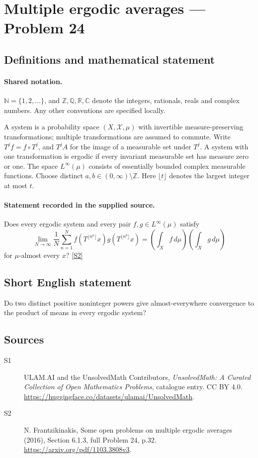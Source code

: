 \documentclass[11pt]{article}
\newcommand{\sref}[2]{\hyperlink{source:#1:#2}{[S#2]}}
\begin{document}
\section{Multiple ergodic averages — Problem 24}\label{statement}

\subsection{Definitions and mathematical statement}

\paragraph{Shared notation.}$\mathbb N=\{1,2,\ldots\}$, and $\mathbb Z,\mathbb Q,\mathbb R,\mathbb C$ denote the integers, rationals, reals and complex numbers. Any other conventions are specified locally.


A system is a probability space $(X,\mathcal X,\mu)$ with invertible measure-preserving transformations; multiple transformations are assumed to commute. Write $T^j f=f\circ T^j$, and $T^j A$ for the image of a measurable set under $T^j$. A system with one transformation is ergodic if every invariant measurable set has measure zero or one. The space $L^\infty(\mu)$ consists of essentially bounded complex measurable functions. Choose distinct $a,b\in(0,\infty)\setminus\mathbb Z$. Here $\lfloor t\rfloor$ denotes the largest integer at most $t$.
\paragraph{Statement recorded in the supplied source.}
Does every ergodic system and every pair $f,g\in L^\infty(\mu)$ satisfy \[\lim_{N\to\infty}\frac1N\sum_{n=1}^N f(T^{\lfloor n^a\rfloor}x)g(T^{\lfloor n^b\rfloor}x)=\left(\int_X f\,d\mu\right)\left(\int_X g\,d\mu\right)\] for $\mu$-almost every $x$? \sref{statement}{2}
\subsection{Short English statement}
Do two distinct positive noninteger powers give almost-everywhere convergence to the product of means in every ergodic system?
\subsection{Sources}
\begin{description}
\item[\hypertarget{source:statement:1}{S1}] ULAM.AI and the UnsolvedMath Contributors, \emph{UnsolvedMath: A Curated Collection of Open Mathematics Problems}, catalogue entry. CC BY 4.0. \url{https://huggingface.co/datasets/ulamai/UnsolvedMath}.
\item[\hypertarget{source:statement:2}{S2}] N. Frantzikinakis, Some open problems on multiple ergodic averages (2016), Section 6.1.3, full Problem 24, p.32. \url{https://arxiv.org/pdf/1103.3808v3}.
\end{description}
\label{end:statement}
\end{document}
